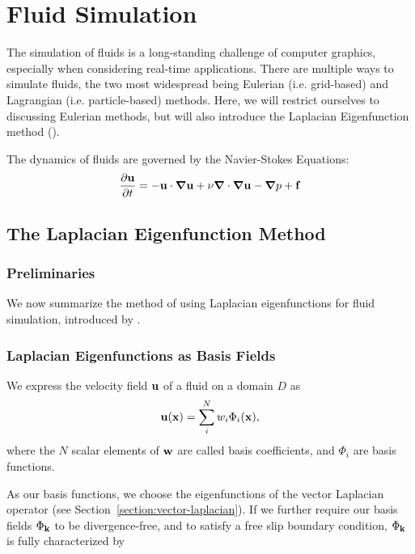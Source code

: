 \chapter{Fluid Simulation}
The simulation of fluids is a long-standing challenge of computer graphics,
especially when considering real-time applications. There are multiple ways to
simulate fluids, the two most widespread being Eulerian (i.e. grid-based) and
Lagrangian (i.e. particle-based) methods. Here, we will restrict ourselves to
discussing Eulerian methods, but will also introduce the Laplacian Eigenfunction
method (\cite{dewitt}).

The dynamics of fluids are governed by the Navier-Stokes Equations:
\begin{equation}
    \label{eq:NSE}
    \begin{aligned}
        \pdv{\vb{u}}{t} = -\vb{u}\cdot\grad{\vb{u}} + 
        \nu \grad\cdot\grad \vb{u} - \grad{p} + \vb{f}
    \end{aligned}
\end{equation}

\section{The Laplacian Eigenfunction Method}
\subsection{Preliminaries}
We now summarize the method of using Laplacian eigenfunctions for fluid
simulation, introduced by \citet{dewitt}.

\subsection*{Laplacian Eigenfunctions as Basis Fields}
We express the velocity field $\vb{u}$ of a fluid on a domain $D$ as
$$\vb{u}(\vb{x})=\sum_i^N w_i \Phi_i(\vb{x}),$$
where the $N$ scalar elements of $\vb{w}$ are called basis coefficients, and
${\Phi_i}$ are basis functions.

As our basis functions, we choose the eigenfunctions of the vector Laplacian
operator (see Section~\ref{section:vector-laplacian}). If we further require our
basis fields $\Phi_{\vb{k}}$ to be divergence-free, and to satisfy a free slip
boundary condition, $\Phi_{\vb{k}}$ is fully characterized by

